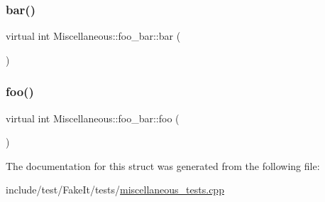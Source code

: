 \subsubsection{\texorpdfstring{bar()}{bar()}}
{\footnotesize\ttfamily virtual int Miscellaneous\+::foo\+\_\+bar\+::bar (\begin{DoxyParamCaption}{ }\end{DoxyParamCaption})\hspace{0.3cm}{\ttfamily [pure virtual]}}

\mbox{\label{structMiscellaneous_1_1foo__bar_a6a6286d52f0e74ce2b90a72c34a5a5dd}} 
\subsubsection{\texorpdfstring{foo()}{foo()}}
{\footnotesize\ttfamily virtual int Miscellaneous\+::foo\+\_\+bar\+::foo (\begin{DoxyParamCaption}{ }\end{DoxyParamCaption})\hspace{0.3cm}{\ttfamily [pure virtual]}}



The documentation for this struct was generated from the following file\+:\begin{DoxyCompactItemize}
\item 
include/test/\+Fake\+It/tests/\mbox{\hyperlink{miscellaneous__tests_8cpp}{miscellaneous\+\_\+tests.\+cpp}}\end{DoxyCompactItemize}
